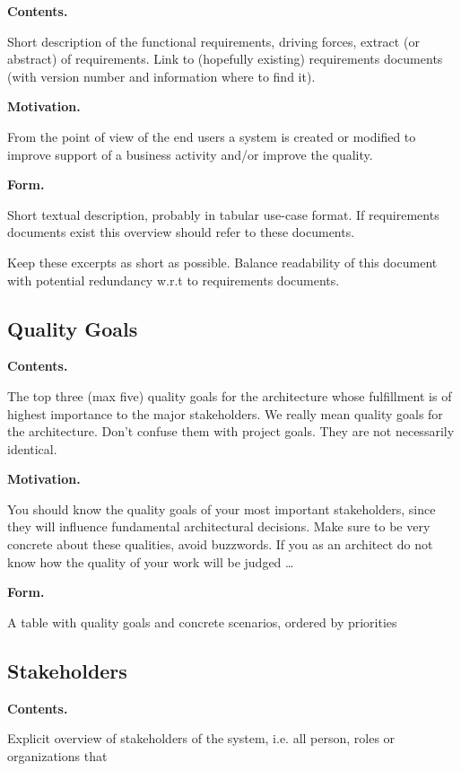 \documentclass[]{article}
\begin{document}
\textbf{Contents.}

Short description of the functional requirements, driving forces,
extract (or abstract) of requirements. Link to (hopefully existing)
requirements documents (with version number and information where to
find it).

\textbf{Motivation.}

From the point of view of the end users a system is created or modified
to improve support of a business activity and/or improve the quality.

\textbf{Form.}

Short textual description, probably in tabular use-case format. If
requirements documents exist this overview should refer to these
documents.

Keep these excerpts as short as possible. Balance readability of this
document with potential redundancy w.r.t to requirements documents.

\hypertarget{_quality_goals}{%
\subsection{Quality Goals}\label{_quality_goals}}

\textbf{Contents.}

The top three (max five) quality goals for the architecture whose
fulfillment is of highest importance to the major stakeholders. We
really mean quality goals for the architecture. Don't confuse them with
project goals. They are not necessarily identical.

\textbf{Motivation.}

You should know the quality goals of your most important stakeholders,
since they will influence fundamental architectural decisions. Make sure
to be very concrete about these qualities, avoid buzzwords. If you as an
architect do not know how the quality of your work will be judged
\ldots{}

\textbf{Form.}

A table with quality goals and concrete scenarios, ordered by priorities

\hypertarget{_stakeholders}{%
\subsection{Stakeholders}\label{_stakeholders}}

\textbf{Contents.}

Explicit overview of stakeholders of the system, i.e. all person, roles
or organizations that
\end{document}
